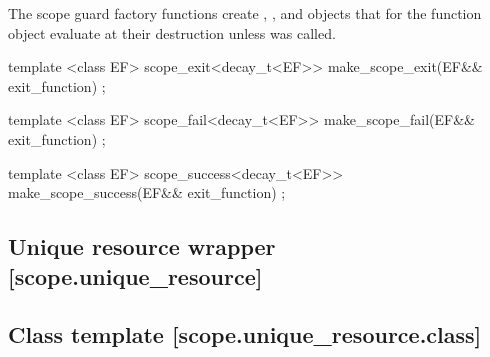 \documentclass[ebook,11pt,article]{memoir}
\begin{document}
\pnum
The scope guard factory functions create , , and  objects that for the function object  evaluate  at their destruction unless  was called.

\begin{itemdecl}
template <class EF>
scope_exit<decay_t<EF>> make_scope_exit(EF&& exit_function) ;
\end{itemdecl}

\begin{itemdescr}
\pnum
\returns {}
\end{itemdescr}

\begin{itemdecl}
template <class EF>
scope_fail<decay_t<EF>> make_scope_fail(EF&& exit_function) ;
\end{itemdecl}

\begin{itemdescr}
\pnum
\pnum
\returns {}
\end{itemdescr}

\begin{itemdecl}
template <class EF>
scope_success<decay_t<EF>> make_scope_success(EF&& exit_function) ;
\end{itemdecl}

\begin{itemdescr}
\pnum
\pnum
\returns {}

\end{itemdescr}


\newpage

\subsection{Unique resource wrapper [scope.unique_resource]}

\subsection {Class template  [scope.unique_resource.class]}
\end{document}
